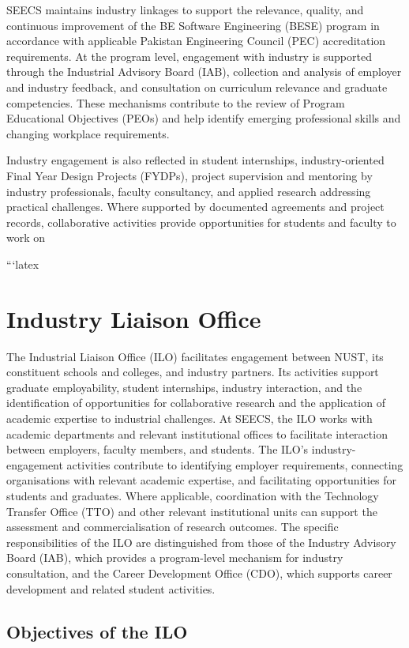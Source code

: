 SEECS maintains industry linkages to support the relevance, quality,
and continuous improvement of the BE Software Engineering (BESE)
program in accordance with applicable Pakistan Engineering Council
(PEC) accreditation requirements. At the program level, engagement
with industry is supported through the Industrial Advisory Board
(IAB), collection and analysis of employer and industry feedback,
and consultation on curriculum relevance and graduate competencies.
These mechanisms contribute to the review of Program Educational
Objectives (PEOs) and help identify emerging professional skills
and changing workplace requirements.

Industry engagement is also reflected in student internships,
industry-oriented Final Year Design Projects (FYDPs), project
supervision and mentoring by industry professionals, faculty
consultancy, and applied research addressing practical challenges.
Where supported by documented agreements and project records,
collaborative activities provide opportunities for students and
faculty to work on

```latex
\section{Industry Liaison Office}

The Industrial Liaison Office (ILO) facilitates engagement between
NUST, its constituent schools and colleges, and industry partners.
Its activities support graduate employability, student internships,
industry interaction, and the identification of opportunities for
collaborative research and the application of academic expertise to
industrial challenges. At SEECS, the ILO works with academic
departments and relevant institutional offices to facilitate
interaction between employers, faculty members, and students. The ILO's industry-engagement activities contribute to identifying
employer requirements, connecting organisations with relevant
academic expertise, and facilitating opportunities for students
and graduates. Where applicable, coordination with the Technology
Transfer Office (TTO) and other relevant institutional units can
support the assessment and commercialisation of research outcomes.
The specific responsibilities of the ILO are distinguished from
those of the Industry Advisory Board (IAB), which provides a
program-level mechanism for industry consultation, and the
Career Development Office (CDO), which supports career development
and related student activities.

\subsection{Objectives of the ILO}

